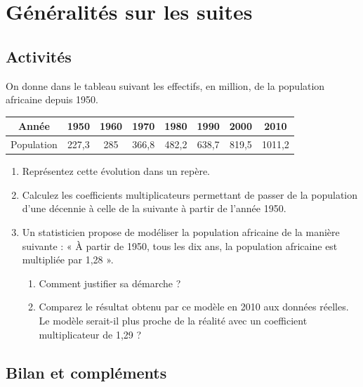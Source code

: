 \documentclass[12pt,a4paper,french]{book}
\begin{document}
\tableofcontents

\chapter{Généralités sur les suites}


\section{Activités}

On donne dans le tableau suivant les effectifs, en million, de la population africaine depuis 1950.

\begin{center}
\begin{tabular}{|c|c|c|c|c|c|c|c|}
    \hline
    Année & 1950 & 1960 & 1970 & 1980 & 1990 & 2000 & 2010 \\
    \hline
    Population & 227,3 & 285 & 366,8 & 482,2 & 638,7 & 819,5 & 1011,2 \\
    \hline
\end{tabular}
\end{center}

\begin{act}
\begin{enumerate}
    \item Représentez cette évolution dans un repère.
    \item Calculez les coefficients multiplicateurs permettant de passer de la population d'une décennie à celle de la suivante à partir de l'année 1950.
    \item Un statisticien propose de modéliser la population africaine de la manière suivante : « À partir de 1950, tous les dix ans, la population africaine est multipliée par 1,28 ».
    \begin{enumerate}
        \item Comment justifier sa démarche ?
        \item Comparez le résultat obtenu par ce modèle en 2010 aux données réelles. Le modèle serait-il plus proche de la réalité avec un coefficient multiplicateur de 1,29 ?
    \end{enumerate}
\end{enumerate}
\end{act}

\section{Bilan et compléments}
\end{document}
